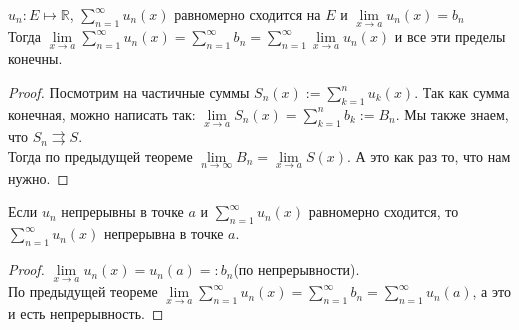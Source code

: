 \begin{theorem} \thmslashn

  $u_n : E \mapsto \mathbb{R}$, $\sum\limits_{n = 1}^{\infty} u_n(x)$ равномерно сходится на $E$ и $\lim\limits_{x\to a} u_n(x) = b_n$\\
  Тогда $\lim\limits_{x\to a} \sum\limits_{n = 1}^{\infty} u_n(x) = \sum\limits_{n = 1}^{\infty} b_n = \sum\limits_{n = 1}^{\infty} \lim\limits_{x\to a} u_n(x)$ и все эти пределы конечны.
\begin{proof} \thmslashn
  
  Посмотрим на частичные суммы $S_n(x) := \sum\limits_{k = 1}^{n} u_k(x)$. Так как сумма конечная, можно написать так: 
  $\lim\limits_{x\to a} S_n(x) = \sum\limits_{k = 1}^{n} b_k := B_n$. Мы также знаем, что $S_n \rightrightarrows S$.\\
  Тогда по предыдущей теореме $\lim\limits_{n\to \infty} B_n = \lim\limits_{x\to a} S(x)$. А это как раз то, что нам нужно.
\end{proof}
\end{theorem}

\begin{consequence} \thmslashn

  Если $u_n$ непрерывны в точке $a$ и $\sum\limits_{n = 1}^{\infty} u_n(x)$ равномерно сходится, то $\sum\limits_{n = 1}^{\infty} u_n(x)$ непрерывна в точке $a$.
\begin{proof} \thmslashn
  
  $\lim\limits_{x\to a} u_n(x) = u_n(a) =: b_n$(по непрерывности).\\ По предыдущей теореме $\lim\limits_{x\to a} \sum\limits_{n = 1}^{\infty} u_n(x) = \sum\limits_{n = 1}^{\infty} b_n = \sum\limits_{n = 1}^{\infty} u_n(a)$, а это и есть непрерывность.
  
\end{proof}
\end{consequence}